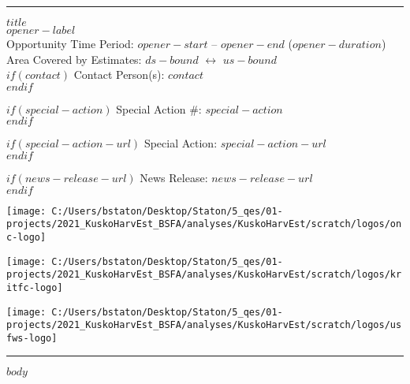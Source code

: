 \documentclass[letterpaper,11pt,$for(classoption)$$classoption$$sep$,$endfor$]{article}
\begin{document}
\rule{\textwidth}{1pt}
\begin{flushleft}

{\bf\LARGE{$title$}}\\
{\Large{$opener-label$}}\\

{\small{Opportunity Time Period: $opener-start$ -- $opener-end$ ($opener-duration$)}}\\

{\small{Area Covered by Estimates: $ds-bound$ \( \longleftrightarrow \) $us-bound$}}\\

$if(contact)$
{\small{Contact Person(s): $contact$}}\\
$endif$

$if(special-action)$
{\small{Special Action \#: $special-action$}}\\
$endif$

$if(special-action-url)$
{\small{Special Action: $special-action-url$}}\\
$endif$

$if(news-release-url)$
{\small{News Release: $news-release-url$}}\\
$endif$
\end{flushleft}

\begin{minipage}[ht]{0.33\textwidth}
\centering
\texttt{[image: C:/Users/bstaton/Desktop/Staton/5\_qes/01-projects/2021\_KuskoHarvEst\_BSFA/analyses/KuskoHarvEst/scratch/logos/onc-logo]}
\end{minipage}
\begin{minipage}[ht]{0.33\textwidth}
\centering
\texttt{[image: C:/Users/bstaton/Desktop/Staton/5\_qes/01-projects/2021\_KuskoHarvEst\_BSFA/analyses/KuskoHarvEst/scratch/logos/kritfc-logo]}
\end{minipage}
\begin{minipage}[ht]{0.33\textwidth}
\centering
\texttt{[image: C:/Users/bstaton/Desktop/Staton/5\_qes/01-projects/2021\_KuskoHarvEst\_BSFA/analyses/KuskoHarvEst/scratch/logos/usfws-logo]}
\end{minipage}

\rule{\textwidth}{1pt}

$body$

\end{document}
